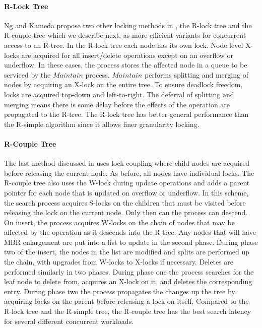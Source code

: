 \paragraph{R-Lock Tree} Ng and Kameda propose two other locking methods in 
\cite{ng1993concurrent}, the R-lock tree and the R-couple tree which we describe 
next, as more efficient variants for concurrent access to an R-tree. In the R-lock 
tree each node has its own lock. Node level X-locks are acquired for all 
insert/delete operations except on an overflow or underflow. In these cases, the 
process stores the affected node in a queue to be serviced by the $Maintain$ process.
$Maintain$ performs splitting and merging of nodes by acquiring an X-lock on the 
entire tree. To ensure deadlock freedom, locks are acquired top-down and 
left-to-right. The deferral of splitting and merging means there is some delay
before the effects of the operation are propagated to the R-tree. The R-lock tree
has better general performance than the R-simple algorithm since it allows finer 
granularity locking.

\paragraph{R-Couple Tree} The last method discussed in \cite{ng1993concurrent}
uses lock-coupling where child nodes are acquired before releasing the current
node. As before, all nodes have individual locks. The R-couple tree also uses 
the W-lock during update operations and adds a parent pointer for
each node that is updated on overflow or underflow. In this scheme, the search 
process acquires S-locks on the children that must be visited before releasing 
the lock on the current node. Only then can the process can descend. On insert, 
the process acquires W-locks on the chain of nodes that may be affected by the 
operation as it descends into the R-tree. Any nodes that will have MBR 
enlargement are put into a list to update in the second phase. During phase two 
of the insert, the nodes in the list are modified and splits are performed up
the chain, with upgrades from W-locks to X-locks if necessary. Deletes are 
performed similarly in two phases. During phase one the process searches for the 
leaf node to delete from, acquires an X-lock on it, and deletes the corresponding
entry. During phase two the process propagates the changes up the tree by 
acquiring locks on the parent before releasing a lock on itself. Compared to the 
R-lock tree and the R-simple tree, the R-couple tree has the best search latency 
for several different concurrent workloads. 

